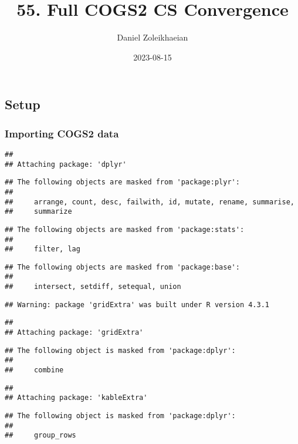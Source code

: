 \documentclass[
]{article}
\title{55. Full COGS2 CS Convergence}
\author{Daniel Zoleikhaeian}
\date{2023-08-15}
\begin{document}
\maketitle

\hypertarget{setup}{%
\subsection{Setup}\label{setup}}

\hypertarget{importing-cogs2-data}{%
\subsubsection{Importing COGS2 data}\label{importing-cogs2-data}}

\begin{verbatim}
## 
## Attaching package: 'dplyr'
\end{verbatim}

\begin{verbatim}
## The following objects are masked from 'package:plyr':
## 
##     arrange, count, desc, failwith, id, mutate, rename, summarise,
##     summarize
\end{verbatim}

\begin{verbatim}
## The following objects are masked from 'package:stats':
## 
##     filter, lag
\end{verbatim}

\begin{verbatim}
## The following objects are masked from 'package:base':
## 
##     intersect, setdiff, setequal, union
\end{verbatim}

\begin{verbatim}
## Warning: package 'gridExtra' was built under R version 4.3.1
\end{verbatim}

\begin{verbatim}
## 
## Attaching package: 'gridExtra'
\end{verbatim}

\begin{verbatim}
## The following object is masked from 'package:dplyr':
## 
##     combine
\end{verbatim}

\begin{verbatim}
## 
## Attaching package: 'kableExtra'
\end{verbatim}

\begin{verbatim}
## The following object is masked from 'package:dplyr':
## 
##     group_rows
\end{verbatim}
\end{document}
